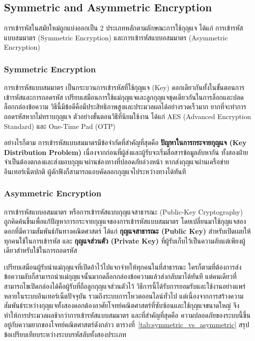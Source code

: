 
\subsection{Symmetric and Asymmetric Encryption}
การเข้ารหัสในสมัยใหม่ถูกแบ่งออกเป็น 2 ประเภทหลักตามลักษณะการใช้กุญแจ ได้แก่ การเข้ารหัสแบบสมมาตร (Symmetric Encryption) และการเข้ารหัสแบบอสมมาตร (Asymmetric Encryption)

\subsubsection{Symmetric Encryption}
การเข้ารหัสแบบสมมาตร เป็นกระบวนการเข้ารหัสที่ใช้กุญแจ (Key) ดอกเดียวกันทั้งในขั้นตอนการเข้ารหัสและการถอดรหัส เปรียบเสมือนการใช้แม่กุญแจและลูกกุญแจชุดเดียวกันในการล็อกและปลดล็อกกล่องข้อความ วิธีนี้มีข้อดีคือมีประสิทธิภาพสูงและประมวลผลได้อย่างรวดเร็วมาก ยากที่จะทำการถอดรหัสหากไม่ทราบกุญแจ ตัวอย่างขั้นตอนวิธีที่นิยมใช้งาน ได้แก่ AES (Advanced Encryption Standard) และ One-Time Pad (OTP)

อย่างไรก็ตาม การเข้ารหัสแบบสมมาตรมีข้อจำกัดที่สำคัญที่สุดคือ \textbf{ปัญหาในการกระจายกุญแจ (Key Distribution Problem)} เนื่องจากก่อนที่ผู้ส่งและผู้รับจะเริ่มสื่อสารข้อมูลลับหากัน ทั้งสองฝ่ายจำเป็นต้องตกลงและส่งมอบกุญแจผ่านช่องทางที่ปลอดภัยล่วงหน้า หากส่งกุญแจผ่านเครือข่ายอินเทอร์เน็ตปกติ ผู้ดักฟังก็สามารถแอบคัดลอกกุญแจไประหว่างทางได้ทันที

\subsubsection{Asymmetric Encryption}
การเข้ารหัสแบบอสมมาตร หรือการเข้ารหัสแบบกุญแจสาธารณะ (Public-Key Cryptography)~\cite{diffie_hellman, rivest_rsa} ถูกคิดค้นขึ้นเพื่อแก้ปัญหาการกระจายกุญแจของการเข้ารหัสแบบสมมาตร โดยเปลี่ยนมาใช้กุญแจสองดอกที่มีความสัมพันธ์กันทางคณิตศาสตร์ ได้แก่ \textbf{กุญแจสาธารณะ (Public Key)} สำหรับเปิดเผยให้ทุกคนใช้ในการเข้ารหัส และ \textbf{กุญแจส่วนตัว (Private Key)} ที่ผู้รับเก็บไว้เป็นความลับแต่เพียงผู้เดียวสำหรับใช้ในการถอดรหัส

เปรียบเสมือนผู้รับนำแม่กุญแจที่เปิดอ้าไว้ไปแจกจ่ายให้ทุกคนในที่สาธารณะ ใครก็ตามที่ต้องการส่งข้อความลับก็สามารถนำแม่กุญแจนั้นมากดล็อกกล่องข้อความแล้วส่งกลับมาได้ทันที แต่คนเดียวที่สามารถไขเปิดกล่องได้คือผู้รับที่ถือลูกกุญแจส่วนตัวไว้ วิธีการนี้ได้รับการยอมรับและใช้งานอย่างแพร่หลายในระบบอินเทอร์เน็ตปัจจุบัน รวมถึงระบบการโหวตออนไลน์ทั่วไป แต่เนื่องจากการสร้างความสัมพันธ์ระหว่างกุญแจทั้งสองดอกต้องอาศัยโจทย์คณิตศาสตร์ที่ซับซ้อนและใช้กุญแจขนาดใหญ่ จึงทำให้การประมวลผลช้ากว่าการเข้ารหัสแบบสมมาตร และที่สำคัญที่สุดคือ ความปลอดภัยของระบบนี้ขึ้นอยู่กับความยากของโจทย์คณิตศาสตร์ดังกล่าว ตารางที่~\ref{tab:symmetric_vs_asymmetric} สรุปข้อเปรียบเทียบระหว่างระบบรหัสลับทั้งสองประเภท

